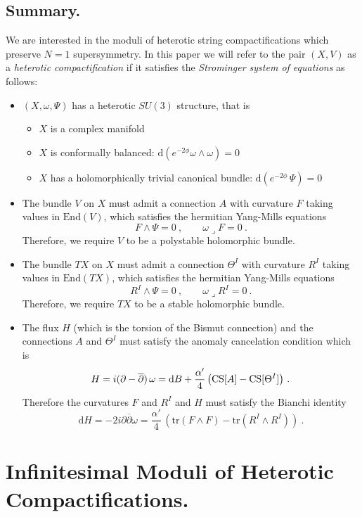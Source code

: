 \documentclass[12pt,a4paper]{article}
\def\bar#1{\overline{#1}}
\let\p=\partial
\def\d{\textrm{d}}
\def\End{\textrm{End}}
\def\bp{\bar{\partial}}
\def\tr{\textrm{tr}}
\theoremstyle{definition}
\begin{document}
\subsection{Summary.}
\label{subsec:sum}

We are interested in the moduli of heterotic string compactifications which preserve $N=1$ supersymmetry.  In this paper we will refer to the pair $(X,V)$ as a {\it heterotic compactification} if it satisfies the {\it Strominger system of equations} as follows:
\begin{itemize}
\item $(X,\omega,\Psi)$ has a heterotic $SU(3)$ structure, that is
\begin{itemize}
\item $X$ is a complex manifold 
\item $X$ is conformally balanced: $\d(e^{-2\phi}\omega\wedge\omega) = 0$
\item $X$ has a holomorphically trivial canonical bundle:  $\d(e^{-2\phi}\, \Psi) = 0$
\end{itemize}
\item The bundle $V$ on $X$ must admit a connection $A$ with curvature $F$ taking values in $\End(V)$, which satisfies the hermitian Yang-Mills equations
\begin{equation*}
F\wedge\Psi  = 0~, \qquad
\omega\lrcorner F = 0~.
\end{equation*} 
Therefore, we require $V$ to be  a polystable holomorphic bundle. 
\item The bundle $TX$ on $X$ must admit a connection $\Theta^I$ with curvature $R^I$ taking values in $\End(TX)$, which satisfies the hermitian Yang-Mills equations
\begin{equation*}
R^I\wedge\Psi  = 0~, \qquad
\omega\lrcorner R^I = 0~.
\end{equation*} 
Therefore, we require $TX$ to be  a stable holomorphic bundle.
\item The flux $H$ (which is the torsion of the Bismut connection) and the connections $A$ and $\Theta^I$ must satisfy the anomaly cancelation condition which is
\[ H = i(\partial-\bar\partial)\,\omega = 
\d B + \frac{\alpha'}{4}\, \big({\rm CS}[A] - {\rm CS}[\Theta^I]\big)~.\]
Therefore the curvatures $F$ and $R^I$  and $H$ must satisfy the Bianchi identity
\[ \d H= - 2 i \p\bp \omega = \frac{\alpha'}{4}\,\left(\tr (F\wedge F) - \tr (R^I\wedge R^I) \right) ~.\] 
\end{itemize}
\newpage 

\section{Infinitesimal Moduli of Heterotic Compactifications.}
\label{sec:moduli}
\end{document}
